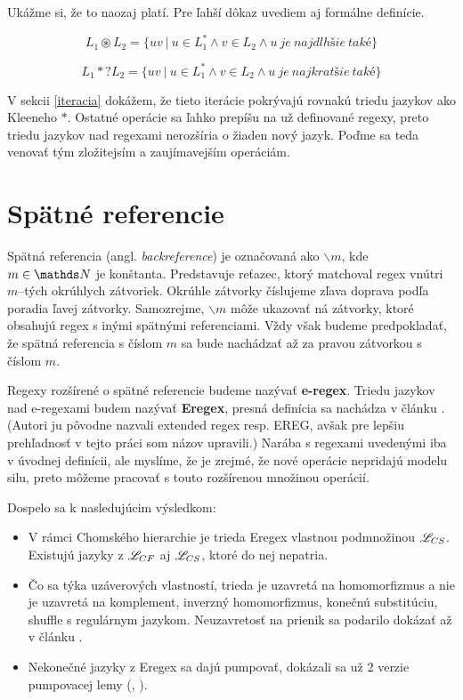 Ukážme si, že to naozaj platí. Pre ľahší dôkaz uvediem aj formálne definície.

\begin{df}
$$ L_{1} \circledast L_{2} = \lbrace uv ~|~ u \in L_1^* \land v \in L_2 \land u~je~najdlhšie~také \rbrace$$
\end{df}

\begin{df}
$$ L_{1} *? L_{2} = \lbrace uv ~|~ u \in L_1^* \land v \in L_2 \land u~je~najkratšie~také \rbrace $$
\end{df}

V sekcii \ref{iteracia} dokážem, že tieto iterácie pokrývajú rovnakú triedu jazykov ako Kleeneho $*$. Ostatné operácie sa ľahko prepíšu na už definované regexy, preto triedu jazykov nad regexami nerozšíria o žiaden nový jazyk. Poďme sa teda venovať tým zložitejsím a zaujímavejším operáciám.

\section{Spätné referencie}\label{chap:backref1}

Spätná referencia (angl. \textit{backreference}) je označovaná ako $ \backslash m $, kde $m \in \N$ je konštanta. Predstavuje reťazec, ktorý matchoval regex vnútri $m$--tých okrúhlych zátvoriek. Okrúhle zátvorky číslujeme zľava doprava podľa poradia ľavej zátvorky. Samozrejme, $\backslash m$ môže ukazovať ná zátvorky, ktoré obsahujú regex s inými spätnými referenciami. Vždy však budeme predpokladať, že spätná referencia s číslom $m$ sa bude nachádzať až za pravou zátvorkou s číslom $m$.

Regexy rozšírené o spätné referencie budeme nazývať \textbf{e-regex}. Triedu jazykov nad e-regexami budem nazývať \textbf{Eregex}, presná definícia sa nachádza v článku \cite{ExtendedRegexPower}. (Autori ju pôvodne nazvali extended regex resp. EREG, avšak pre lepšiu prehľadnosť v tejto práci som názov upravili.) Narába s regexami uvedenými iba v úvodnej definícii, ale myslíme, že je zrejmé, že nové operácie nepridajú modelu silu, preto môžeme pracovať s touto rozšírenou množinou operácií.

Dospelo sa k nasledujúcim výsledkom:
\begin{itemize}
\item V rámci Chomského hierarchie je trieda Eregex vlastnou podmnožinou $\mathscr{L}_{CS}$. Existujú jazyky z $\mathscr{L}_{CF}$ aj $\mathscr{L}_{CS}$, ktoré do nej nepatria.
\item  Čo sa týka uzáverových vlastností, trieda je uzavretá na homomorfizmus a nie je uzavretá na komplement, inverzný homomorfizmus, konečnú substitúciu, shuffle s regulárnym jazykom. Neuzavretosť na prienik sa podarilo dokázať až v článku \cite{ExtendedRegexIntersec}.
\item Nekonečné jazyky z Eregex sa dajú pumpovať, dokázali sa už 2 verzie pumpovacej lemy (\cite[Lemma 1]{ExtendedRegexPower}, \cite[Lemma 3]{ExtendedRegexIntersec}).
\end{itemize}

